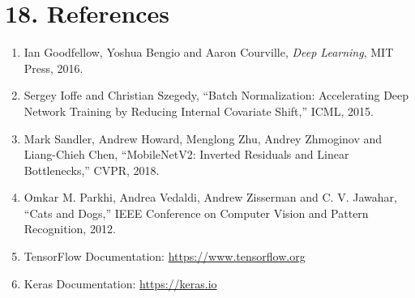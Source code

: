 \documentclass[10pt]{article}
\begin{document}
\section*{18. References}
\begin{enumerate}
\item Ian Goodfellow, Yoshua Bengio and Aaron Courville,
\emph{Deep Learning}, MIT Press, 2016.
\item Sergey Ioffe and Christian Szegedy,
``Batch Normalization: Accelerating Deep Network Training by Reducing
Internal Covariate Shift,'' ICML, 2015.
\item Mark Sandler, Andrew Howard, Menglong Zhu, Andrey Zhmoginov and
Liang-Chieh Chen, ``MobileNetV2: Inverted Residuals and Linear
Bottlenecks,'' CVPR, 2018.
\item Omkar M. Parkhi, Andrea Vedaldi, Andrew Zisserman and C. V. Jawahar,
``Cats and Dogs,'' IEEE Conference on Computer Vision and Pattern
Recognition, 2012.
\item TensorFlow Documentation: \url{https://www.tensorflow.org}
\item Keras Documentation: \url{https://keras.io}
\end{enumerate}
\end{document}
